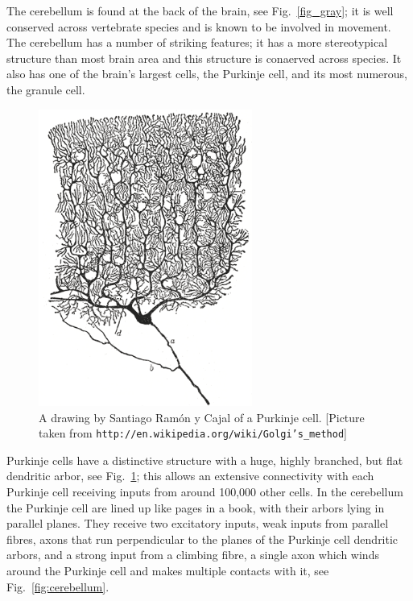 \documentclass[12pt]{article}
\begin{document}
The cerebellum is found at the back of the brain, see
Fig.~\ref{fig_gray}; it is well conserved across vertebrate species
and is known to be involved in movement. The cerebellum has a number
of striking features; it has a more stereotypical structure than most
brain area and this structure is conaerved across species. It also has
one of the brain's largest cells, the Purkinje cell, and its most
numerous, the granule cell.

\begin{figure}
\begin{center}
\includegraphics[width=7cm]{Purkinje_cell_by_Cajal.png}
\end{center}
\caption{A drawing by Santiago Ram\'{o}n y Cajal of a Purkinje cell. [Picture taken from \texttt{http://en.wikipedia.org/wiki/Golgi's\_method}]\label{fig:PC}}
\end{figure}

Purkinje cells have a distinctive structure with a huge, highly
branched, but flat dendritic arbor, see Fig.~\ref{fig:PC}; this allows
an extensive connectivity with each Purkinje cell receiving inputs
from around 100,000 other cells. In the cerebellum the Purkinje cell
are lined up like pages in a book, with their arbors lying in parallel
planes. They receive two excitatory inputs, weak inputs from parallel
fibres, axons that run perpendicular to the planes of the Purkinje
cell dendritic arbors, and a strong input from a climbing fibre, a
single axon which winds around the Purkinje cell and makes multiple
contacts with it, see Fig.~\ref{fig:cerebellum}.
\end{document}
